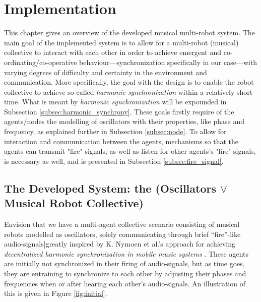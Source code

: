 \chapter{Implementation}
This chapter gives an overview of the developed musical multi-robot system. The main goal of the implemented system is to allow for a multi-robot (musical) collective to interact with each other in order to achieve emergent and co-ordinating/co-operative behaviour—synchronization specifically in our case—with varying degrees of difficulty and certainty in the environment and communication. More specifically, the goal with the design is to enable the robot collective to achieve so-called \textit{harmonic synchronization} within a relatively short time. What is meant by \textit{harmonic synchronization} will be expounded in Subsection \ref{subsec:harmonic_synchrony}. These goals firstly require of the agents/nodes the modelling of oscillators with their properties, like phase and frequency, as explained further in Subsection \ref{subsec:node}. To allow for interaction and communication between the agents, mechanisms so that the agents can transmit "fire"-signals, as well as listen for other agents's "fire"-signals, is necessary as well, and is presented in Subsection \ref{subsec:fire_signal}.



\section{The Developed System: the (Oscillators $\vee$ Musical Robot Collective)}
\label{sec:developed_system}

	Envision that we have a multi-agent collective scenario consisting of musical robots modelled as oscillators, solely communicating through brief ``fire''-like audio-signals|greatly inspired by K. Nymoen et al.'s approach for achieving \textit{decentralized harmonic synchronization in mobile music systems} \cite{nymoen_synch}. These agents are initially not synchronized in their firing of audio-signals, but as time goes, they are entraining to synchronize to each other by adjusting their phases and frequencies when or after hearing each other's audio-signals. An illustration of this is given in Figure \ref{fig:initial}.

